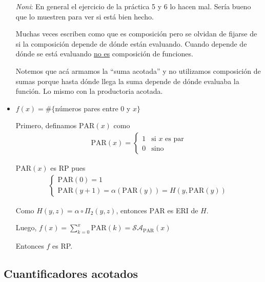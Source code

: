 \begin{itemize}
    \textit{Noni}: En general el ejercicio de la práctica 5 y 6 lo hacen mal.
    Sería bueno que lo muestren para ver si está bien hecho.
    
    Muchas veces escriben como que es composición pero se olvidan de fijarse de
    si la composición depende de dónde están evaluando. Cuando depende de dónde
    se está evaluando \underline{no es} composición de funciones.
    
    Notemos que acá armamos la ``suma acotada'' y no utilizamos composición
    de sumas porque hasta dónde llega la suma depende de dónde evaluaba la 
    función. Lo mismo con la productoria acotada.

    \item $f(x) = \# \{$números pares entre $ 0 $ y $x \}$

        Primero, definamos $\mathrm{PAR}(x)$ como
        \begin{gather*}
            \mathrm{PAR}(x) = \begin{cases}
                1 & \text{si } x \text{ es par} \\
                0 & \text{sino}
            \end{cases}
        \end{gather*}

        $\mathrm{PAR}(x)$ es RP pues
        \begin{gather*}
            \begin{cases}
                \mathrm{PAR}(0) = 1 \\
                \mathrm{PAR}(y+1) = \alpha(\mathrm{PAR}(y)) 
                = H(y, \mathrm{PAR}(y))
            \end{cases}
        \end{gather*}

        Como $H(y, z) = \alpha \circ \Pi_2(y, z)$, entonces $\mathrm{PAR}$ es
        ERI de $H$.

        Luego, $f(x) = \sum_{k = 0}^{x} \mathrm{PAR}(k) 
        = \mathcal{SA}_{\mathrm{PAR}}(x)$

        Entonces $f$ es RP.
\end{itemize}

\subsection{Cuantificadores acotados}

